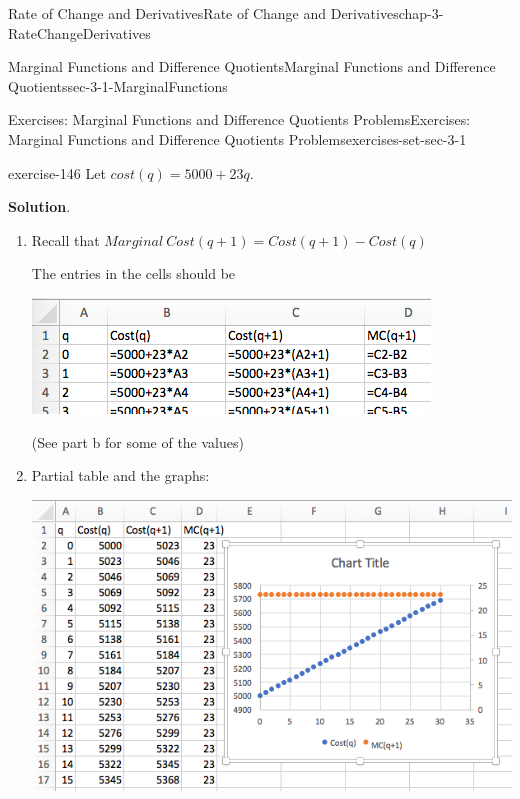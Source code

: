 \documentclass[oneside,10pt,]{book}
\numberwithin{equation}{section}
\begin{document}
\begin{chapterptx}{Rate of Change and Derivatives}{}{Rate of Change and Derivatives}{}{}{chap-3-RateChangeDerivatives}
\begin{sectionptx}{Marginal Functions and Difference Quotients}{}{Marginal Functions and Difference Quotients}{}{}{sec-3-1-MarginalFunctions}
\begin{exercises-subsection-numberless}{Exercises: Marginal Functions and Difference Quotients Problems}{}{Exercises: Marginal Functions and Difference Quotients Problems}{}{}{exercises-set-sec-3-1}
\begin{enumerate}[label=(\alph*)]
\end{enumerate}
\begin{exercisegroup}
\begin{divisionexerciseeg}{7}{}{}{exercise-146}%
\hypertarget{p-963}{}%
Let \(cost(q)=5000+23 q\).%
\par\smallskip%
\noindent\textbf{Solution}.\hypertarget{solution-71}{}\quad%
\leavevmode%
\begin{enumerate}[label=(\alph*)]
\item\hypertarget{li-285}{}\hypertarget{p-964}{}%
Recall that \(Marginal\ Cost(q+1)=Cost(q+1)-Cost(q)\)%
\par
\hypertarget{p-965}{}%
The entries in the cells should be%
\begin{sidebyside}{1}{0.15}{0.15}{0}%
\begin{sbspanel}{0.7}%
\includegraphics[width=1\linewidth]{images/sec3-1-sol7a.png}
\end{sbspanel}%
\end{sidebyside}%
\par
\hypertarget{p-966}{}%
(See part b for some of the values)%
\item\hypertarget{li-286}{}\hypertarget{p-967}{}%
Partial table and the graphs:%
\begin{sidebyside}{1}{0}{0}{0}%
\begin{sbspanel}{1}%
\includegraphics[width=1\linewidth]{images/sec3-1-sol7b.png}

\end{sbspanel}
\end{sidebyside}
\end{enumerate}
\end{divisionexerciseeg}
\end{exercisegroup}
\end{exercises-subsection-numberless}
\end{sectionptx}
\end{chapterptx}
\end{document}
